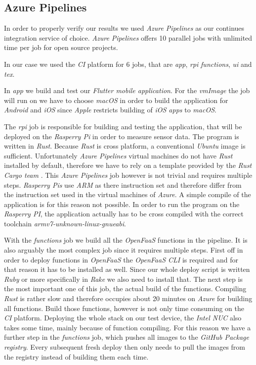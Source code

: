 \subsection{Azure Pipelines}

In order to properly verify our results we used \textit{Azure Pipelines} as our continues
integration service of choice. \textit{Azure Pipelines} offers 10 parallel jobs with unlimited time
per job for open source projects. \cite{azure-pipelines-devop}

In our case we used the \textit{CI} platform for 6 jobs, that are \textit{app}, \textit{rpi}
\textit{functions}, \textit{ui} and \textit{tex}.

In \textit{app} we build and test our \textit{Flutter mobile application}. For the \textit{vmImage}
the job will run on we have to choose \textit{macOS} in order to build the application for
\textit{Android} and \textit{iOS} since \textit{Apple} restricts building of \textit{iOS apps} to
\textit{macOS}.

The \textit{rpi} job is responsible for building and testing the application, that will be deployed
on the \textit{Rasperry Pi} in order to measure sensor data. The program is written in
\textit{Rust}. Because \textit{Rust} is cross platform, a conventional \textit{Ubuntu} image is
sufficient. Unfortunately \textit{Azure Pipelines} virtual machines do not have \textit{Rust}
installed by default, therefore we have to rely on a template provided by the \textit{Rust Cargo
team} \cite{rust-cargo}. This \textit{Azure Pipelines} job however is not trivial and requires
multiple steps. \textit{Rasperry Pis} use \textit{ARM} as there instruction set and therefore differ
from the instruction set used in the virtual machines of \textit{Azure}. A simple compile of the
application is for this reason not possible. In order to run the program on the \textit{Rasperry
PI}, the application actually has to be cross compiled with the correct toolchain
\textit{armv7-unknown-linux-gnueabi}.

With the \textit{functions} job we build all the \textit{OpenFaaS} functions in the pipeline. It is
also arguably the most complex job since it requires multiple steps. First off in order to deploy
functions in \textit{OpenFaaS} the \textit{OpenFaaS CLI} is required and for that reason it has to
be installed as well. Since our whole deploy script is written \textit{Ruby} or more specifically in
\textit{Rake} we also need to install that. The next step is the most important one of this job, the
actual build of the functions. Compiling \textit{Rust} is rather slow and therefore occupies about
20 minutes on \textit{Azure} for building all functions. Build those functions, however is not only
time consuming on the \textit{CI} platform. Deploying the whole stack on our test device, the
\textit{Intel NUC} also takes some time, mainly because of function compiling. For this reason we
have a further step in the \textit{functions} job, which pushes all images to the \textit{GitHub
Package registry}. Every subsequent fresh deploy then only needs to pull the images from the
registry instead of building them each time.

